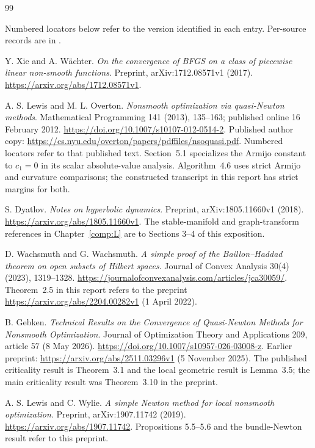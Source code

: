 \begin{thebibliography}{99}
\item[] Numbered locators below refer to the version identified in each entry. Per-source records are in .

Y. Xie and A. W\"achter. \emph{On the convergence of BFGS on a class of piecewise linear non-smooth functions}. Preprint, arXiv:1712.08571v1 (2017). \url{https://arxiv.org/abs/1712.08571v1}.

A. S. Lewis and M. L. Overton. \emph{Nonsmooth optimization via quasi-Newton methods}. Mathematical Programming 141 (2013), 135--163; published online 16 February 2012. \url{https://doi.org/10.1007/s10107-012-0514-2}. Published author copy: \url{https://cs.nyu.edu/overton/papers/pdffiles/nsoquasi.pdf}. Numbered locators refer to that published text. Section~5.1 specializes the Armijo constant to $c_1=0$ in its scalar absolute-value analysis. Algorithm~4.6 uses strict Armijo and curvature comparisons; the constructed transcript in this report has strict margins for both.

S. Dyatlov. \emph{Notes on hyperbolic dynamics}. Preprint, arXiv:1805.11660v1 (2018). \url{https://arxiv.org/abs/1805.11660v1}. The stable-manifold and graph-transform references in Chapter~\ref{comp:L} are to Sections 3--4 of this exposition.

D. Wachsmuth and G. Wachsmuth. \emph{A simple proof of the Baillon--Haddad theorem on open subsets of Hilbert spaces}. Journal of Convex Analysis 30(4) (2023), 1319--1328. \url{https://journalofconvexanalysis.com/articles/jca30059/}. Theorem~2.5 in this report refers to the preprint \url{https://arxiv.org/abs/2204.00282v1} (1 April 2022).

B. Gebken. \emph{Technical Results on the Convergence of Quasi-Newton Methods for Nonsmooth Optimization}. Journal of Optimization Theory and Applications 209, article 57 (8 May 2026). \url{https://doi.org/10.1007/s10957-026-03008-z}. Earlier preprint: \url{https://arxiv.org/abs/2511.03296v1} (5 November 2025). The published criticality result is Theorem~3.1 and the local geometric result is Lemma~3.5; the main criticality result was Theorem~3.10 in the preprint.

A. S. Lewis and C. Wylie. \emph{A simple Newton method for local nonsmooth optimization}. Preprint, arXiv:1907.11742 (2019). \url{https://arxiv.org/abs/1907.11742}. Propositions 5.5--5.6 and the bundle-Newton result refer to this preprint.


\end{thebibliography}
